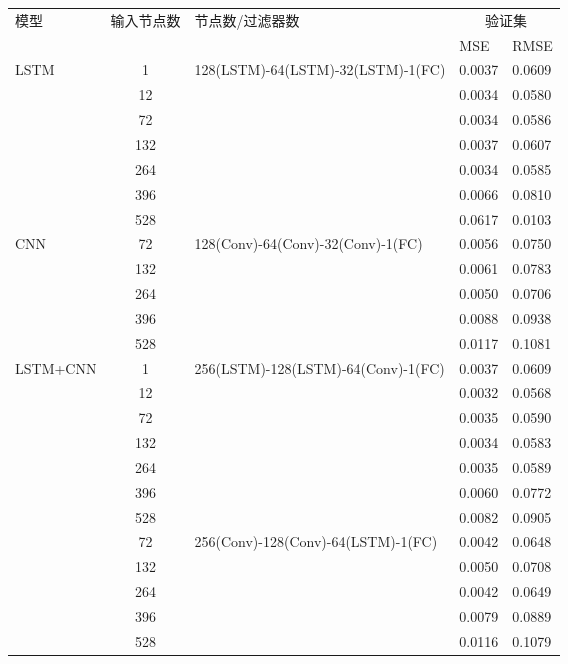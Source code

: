 \begin{table}[!htbp]
    \label{tab:sunspot_number_input_month}
    \centering
    \footnotesize
    \begin{tabular}{lclll}
        \toprule
         \multirow{2}{*}{模型} & \multirow{2}{*}{输入节点数} & \multirow{2}{*}{节点数/过滤器数} & \multicolumn{2}{c}{验证集}\\
        \cmidrule(lr){4-5}
        \noalign{\smallskip}
         & & & MSE & RMSE\\
        \midrule
        LSTM & 1 & 128(LSTM)-64(LSTM)-32(LSTM)-1(FC) & 0.0037 & 0.0609 \\
        & 12 & & 0.0034 & 0.0580 \\
        & 72 & & 0.0034 & 0.0586 \\
        & 132 & & 0.0037 & 0.0607 \\
        & 264 & & 0.0034 & 0.0585 \\
        & 396 & & 0.0066 & 0.0810 \\
        & 528 & & 0.0617 & 0.0103 \\
        \hline
        CNN & 72 & 128(Conv)-64(Conv)-32(Conv)-1(FC) & 0.0056 & 0.0750 \\
        & 132 & & 0.0061 & 0.0783 \\
        & 264 & & 0.0050 & 0.0706 \\
        & 396 & & 0.0088 & 0.0938 \\
        & 528 & & 0.0117 & 0.1081 \\
        \hline
        LSTM+CNN & 1 & 256(LSTM)-128(LSTM)-64(Conv)-1(FC) & 0.0037 & 0.0609 \\
        & 12 & & 0.0032 & 0.0568 \\
        & 72 & & 0.0035 & 0.0590 \\
        & 132 & & 0.0034 & 0.0583 \\
        & 264 & & 0.0035 & 0.0589 \\
        & 396 & & 0.0060 & 0.0772 \\
        & 528 & & 0.0082 & 0.0905 \\
        & 72 & 256(Conv)-128(Conv)-64(LSTM)-1(FC) & 0.0042 & 0.0648 \\
        & 132 & & 0.0050 & 0.0708 \\
        & 264 & & 0.0042 & 0.0649 \\
        & 396 & & 0.0079 & 0.0889 \\
        & 528 & & 0.0116 & 0.1079 \\
        \bottomrule
    \end{tabular}
\end{table}

